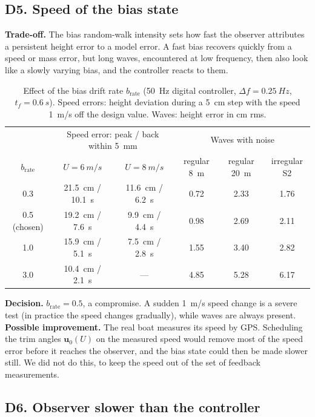 \documentclass[11pt,a4paper]{article}
\begin{document}
\subsection{D5. Speed of the bias state}

\textbf{Trade-off.} The bias random-walk intensity sets how fast the observer
attributes a persistent height error to a model error. A fast bias recovers
quickly from a speed or mass error, but long waves, encountered at low
frequency, then also look like a slowly varying bias, and the controller reacts
to them.

\begin{table}[htbp]
\centering
\small
\caption{Effect of the bias drift rate $b_{\mathrm{rate}}$ (\SI{50}{Hz} digital
controller, $\Delta f=\SI{0.25}{Hz}$, $t_f=\SI{0.6}{s}$). Speed errors: height
deviation during a \SI{5}{cm} step with the speed \SI{1}{m/s} off the design
value. Waves: height error in cm rms.}
\label{tab:brate}
\begin{tabular}{@{}cccccc@{}}
\toprule
 & \multicolumn{2}{c}{Speed error: peak / back within \SI{5}{mm}} & \multicolumn{3}{c}{Waves with noise} \\
$b_{\mathrm{rate}}$ & $U=\SI{6}{m/s}$ & $U=\SI{8}{m/s}$ & regular \SI{8}{m} & regular \SI{20}{m} & irregular S2 \\ \midrule
0.3 & \SI{21.5}{cm} / \SI{10.1}{s} & \SI{11.6}{cm} / \SI{6.2}{s} & 0.72 & 2.33 & 1.76 \\
0.5 (chosen) & \SI{19.2}{cm} / \SI{7.6}{s} & \SI{9.9}{cm} / \SI{4.4}{s} & 0.98 & 2.69 & 2.11 \\
1.0 & \SI{15.9}{cm} / \SI{5.1}{s} & \SI{7.5}{cm} / \SI{2.8}{s} & 1.55 & 3.40 & 2.82 \\
3.0 & \SI{10.4}{cm} / \SI{2.1}{s} & --- & 4.85 & 5.28 & 6.17 \\
\bottomrule
\end{tabular}
\end{table}

\textbf{Decision.} $b_{\mathrm{rate}}=0.5$, a compromise. A sudden \SI{1}{m/s}
speed change is a severe test (in practice the speed changes gradually), while
waves are always present. \textbf{Possible improvement.} The real boat measures
its speed by GPS. Scheduling the trim angles $\bm u_0(U)$ on the measured speed
would remove most of the speed error before it reaches the observer, and the bias
state could then be made slower still. We did not do this, to keep the speed out
of the set of feedback measurements.

\subsection{D6. Observer slower than the controller}
\end{document}
